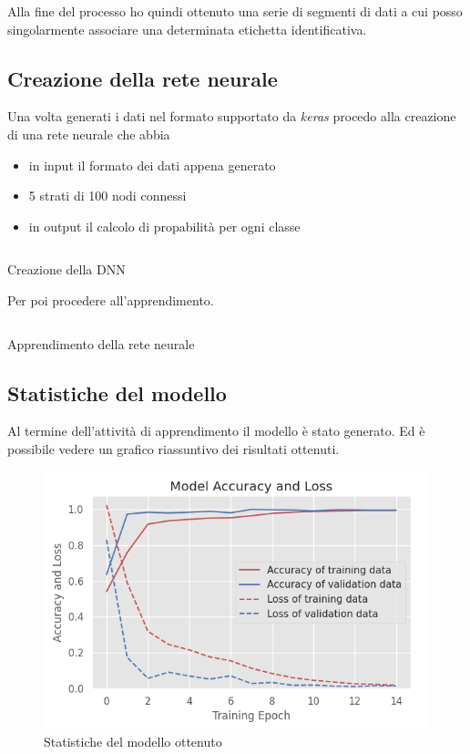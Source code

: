 Alla fine del processo ho quindi ottenuto una serie di segmenti di dati a cui posso singolarmente associare una determinata
etichetta identificativa.


\subsection{Creazione della rete neurale}
Una volta generati i dati nel formato supportato da \textit{keras} procedo alla creazione di 
una rete neurale che abbia
\begin{itemize}
    \item in input il formato dei dati appena generato
    \item 5 strati di 100 nodi connessi
    \item in output il calcolo di propabilità per ogni classe
\end{itemize}
\begin{listing}[H] 
    \inputminted[frame=single,framesep=10pt]{python}{assets/snippets/classifier/dnn_create.py}
    \caption{Creazione della DNN}
\end{listing}
Per poi procedere all'apprendimento.
\begin{listing}[H] 
    \inputminted[frame=single,framesep=10pt]{python}{assets/snippets/classifier/dnn_fit.py}
    \caption{Apprendimento della rete neurale}
\end{listing}


\subsection{Statistiche del modello}
Al termine dell'attività di apprendimento il modello è stato generato. Ed è possibile vedere un grafico 
riassuntivo dei risultati ottenuti.
\begin{figure}[H]
    \centering
    \includegraphics[scale = 0.60]{assets/images/classifications/accelerometer/right_hand/model-right-hand-acc.png}
    \caption{Statistiche del modello ottenuto}
\end{figure}


